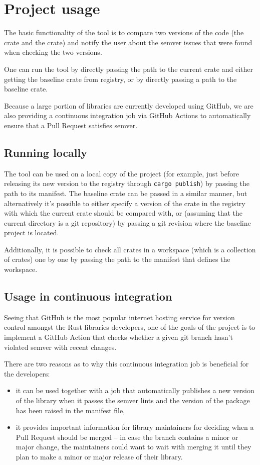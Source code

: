 \documentclass[licencjacka,en]{pracamgr}
\begin{document}
\section{Project usage}

The basic functionality of the tool is to compare two versions of the code (the  crate
and the  crate) and notify the user about the semver issues that were found when
checking the two versions.

One can run the tool by directly passing the path to the current crate and either getting the
baseline crate from registry, or by directly passing a path to the baseline crate.

Because a large portion of libraries are currently developed using GitHub, we are also providing
a continuous integration job via GitHub Actions to automatically ensure that a Pull Request
satisfies semver.

\subsection{Running locally}

The tool can be used on a local copy of the project (for example, just before releasing its new
version to the registry through \texttt{cargo publish}) by passing the path to its manifest.
The baseline crate can be passed in a similar manner, but alternatively it's possible to either
specify a version of the crate in the registry with which the current crate should be compared
with, or (assuming that the current directory is a git repository) by passing a git revision where
the baseline project is located.

Additionally, it is possible to check all crates in a workspace (which is a collection of crates)
one by one by passing the path to the manifest that defines the workspace.

\subsection{Usage in continuous integration}

Seeing that GitHub is the most popular internet hosting service for version control amongst the
Rust libraries developers, one of the goals of the project is to implement a GitHub Action that
checks whether a given git branch hasn't violated semver with recent changes.

There are two reasons as to why this continuous integration job is beneficial for the developers:
\begin{itemize}
	\item it can be used together with a job that automatically publishes a new version of the
		library when it passes the semver lints and the version of the package has been raised
		in the manifest file,
	\item it provides important information for library maintainers for deciding when a Pull
		Request should be merged -- in case the branch contains a minor or major change, the
		maintainers could want to wait with merging it until they plan to make a minor or major
		release of their library.
\end{itemize}
\end{document}
